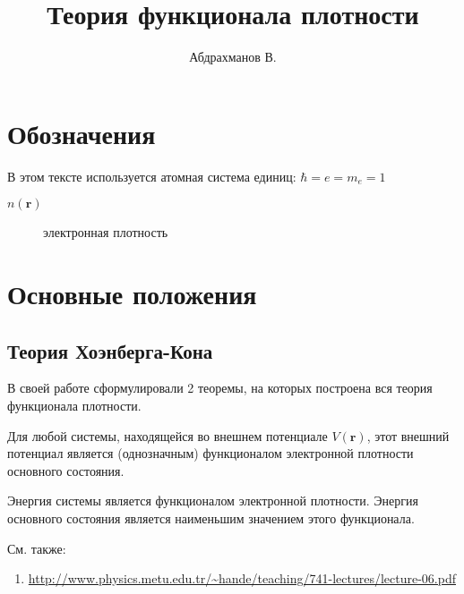 \documentclass[article]{ncc}
\title{Теория функционала плотности}
\author{Абдрахманов В.}
\renewcommand{\vec}{\boldsymbol}
\begin{document}
    \maketitle
    \tableofcontents
    \section*{Обозначения}
    В этом тексте используется атомная система единиц: $ \hbar = e = m_e = 1$
    \begin{description}
        \item[$n(\vec{r})$] электронная плотность
    \end{description}
    \section{Основные положения}
    \subsection{Теория Хоэнберга-Кона}
    В своей работе \cite{Hohenberg-Kohn} сформулировали 2 теоремы, на которых построена вся теория функционала плотности.

    \begin{theorem}
        Для любой системы, находящейся во внешнем потенциале \( V(\vec{r}) \), этот внешний потенциал является (однозначным) функционалом электронной плотности основного состояния.
    \end{theorem}

    \begin{theorem}
        Энергия системы является функционалом электронной плотности. Энергия основного состояния является наименьшим значением этого функционала.
    \end{theorem}

    См. также:
    \begin{enumerate}
        \item \url{http://www.physics.metu.edu.tr/~hande/teaching/741-lectures/lecture-06.pdf}
    \end{enumerate}
\end{document}
